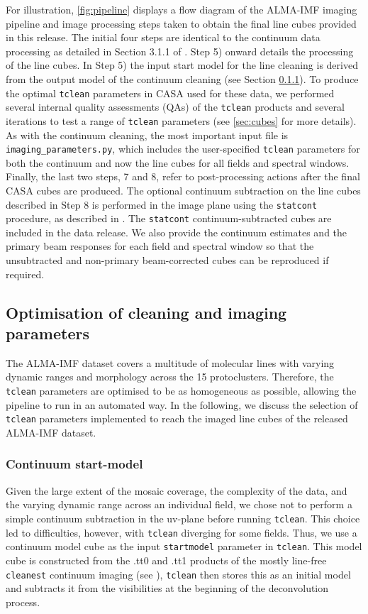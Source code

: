 \documentclass[longauth]{aa} %
\newcommand\statcont{\texttt{statcont}\xspace}
\newcommand\tclean{\texttt{tclean}\xspace}
\begin{document}
For illustration, \cref{fig:pipeline} displays a flow diagram of the ALMA-IMF imaging pipeline and image processing steps taken to obtain the final line cubes provided in this release. The initial four steps are identical to the continuum data processing as detailed in Section 3.1.1 of \citet{Ginsburg2022}. Step 5) onward details the processing of the line cubes. In Step 5) the input start model for the line cleaning is derived from the output model of the continuum cleaning (see Section \ref{sec:startmodel}). To produce the optimal \tclean parameters in CASA used for these data, we performed several internal quality assessments (QAs) of the \tclean products and several iterations to test a range of \tclean parameters (see \ref{sec:cubes} for more details). As with the continuum cleaning, the most important input file is \texttt{imaging\_parameters.py}, which includes the user-specified \tclean parameters for both the continuum and now the line cubes for all fields and spectral windows. Finally, the last two steps, 7 and 8, refer to post-processing actions after the final CASA cubes are produced. The optional continuum subtraction on the line cubes described in Step 8 is performed in the image plane using the \statcont procedure, as described in \citet{statcont2017}. The \statcont continuum-subtracted cubes are included in the data release. We also provide the continuum estimates and the primary beam responses for each field and spectral window so that the unsubtracted and non-primary beam-corrected cubes can be reproduced if required. 
\subsection{Optimisation of cleaning and imaging parameters\label{sec:cubes}}
 The ALMA-IMF dataset covers a multitude of molecular lines with varying dynamic ranges and morphology across the 15 protoclusters. Therefore, the \tclean parameters are optimised to be as homogeneous as possible, allowing the pipeline to run in an automated way. In the following, we discuss the selection of \tclean parameters implemented to reach the imaged line cubes of the released ALMA-IMF dataset. 

\subsubsection{Continuum start-model}
\label{sec:startmodel}
Given the large extent of the mosaic coverage, the complexity of the data, and the varying dynamic range across an individual field, we chose not to perform a simple continuum subtraction in the uv-plane before running \tclean. This choice led to difficulties, however, with \tclean diverging for some fields. Thus, we use a continuum model cube as the input \texttt{startmodel} parameter in \tclean. This model cube is constructed from the .tt0 and .tt1 products of the mostly line-free \texttt{cleanest} continuum imaging (see \citealt{Ginsburg2022}), \tclean then stores this as an initial model and subtracts it from the visibilities at the beginning of the deconvolution process.
\end{document}
